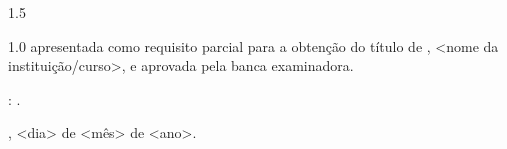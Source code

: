 
\begin{center}
  \vspace*{0.3cm}
  {\bfseries\MakeUppercase{\imprimirautor}\par}

  \vspace{0.9cm}

  \begin{Spacing}{1.5}
    {\bfseries\@ppgFmtTitulo\par}
  \end{Spacing}
\end{center}

\vspace{0.7cm}

\noindent\hspace*{0.43\textwidth}%
\begin{minipage}{0.5\textwidth}
  \begin{Spacing}{1.0}
    \imprimirtipotrabalho{} apresentada como requisito parcial para a obtenção
    do título de \degree{} \imprimirespecialidade, <nome da instituição/curso>,
    e aprovada pela banca examinadora.

    \vspace{6pt}
    \arealabel: \imprimirarea.

    \vspace{6pt}
    \imprimirlocal, <dia> de <mês> de <ano>.
  \end{Spacing}
\end{minipage}

\vspace{0.9cm}


